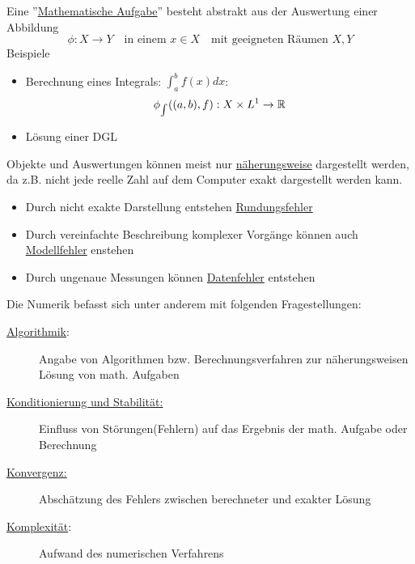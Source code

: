 \documentclass[../Skript.tex]{subfiles}
\begin{document}
Eine ''\underline{Mathematische Aufgabe}'' besteht abstrakt aus der 
Auswertung einer Abbildung \[
    \phi: X\to Y\quad\text{in einem $x\in X$}\quad \text{mit geeigneten Räumen }X,Y
\]
Beispiele \begin{itemize}
    \item Berechnung eines Integrals: $\int_a^b f(x)dx$: \[
    \phi_{\int}((a,b), f): X\times L^1\to \mathbb{R} 
    \]
    \item Lösung einer DGL 
\end{itemize}
Objekte und Auswertungen können meist nur \underline{näherungsweise} dargestellt werden, da z.B. 
nicht jede reelle Zahl auf dem Computer exakt dargestellt werden kann. 
\begin{itemize}
    \item Durch nicht exakte Darstellung entstehen \underline{Rundungsfehler}
    \item Durch vereinfachte Beschreibung komplexer Vorgänge können auch \underline{Modellfehler} 
    enstehen
    \item Durch ungenaue Messungen können \underline{Datenfehler} entstehen
\end{itemize}
Die Numerik befasst sich unter anderem mit folgenden Fragestellungen:\begin{description}
    \item[\underline{Algorithmik}:] Angabe von Algorithmen bzw. Berechnungsverfahren zur näherungsweisen
    Lösung von math. Aufgaben
    \item[\underline{Konditionierung und Stabilität:}] Einfluss von Störungen(Fehlern) auf das Ergebnis
    der math. Aufgabe oder Berechnung
    \item[\underline{Konvergenz:}] Abschätzung des Fehlers zwischen berechneter und exakter Lösung
    \item[\underline{Komplexität}:] Aufwand des numerischen Verfahrens
\end{description} 
\end{document}
